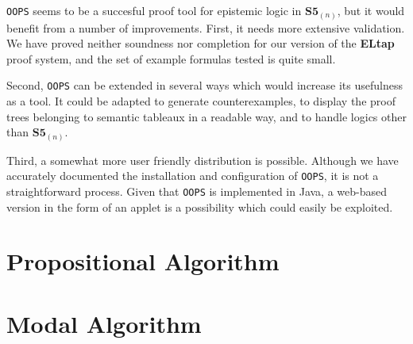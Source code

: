 \documentclass[11pt,a4paper]{article}
\begin{document}
{\tt OOPS} seems to be a succesful proof tool for epistemic logic in  $\textbf{S5}_{(n)}$, but it would benefit from a number of improvements. First, it needs more extensive validation. We have proved neither soundness nor completion for our version of the {\bf ELtap}~\cite{these} proof system, and the set of example formulas tested is quite small.
\par Second, {\tt OOPS} can be extended in several ways which would increase its usefulness as a tool. It could be adapted to generate counterexamples, to display the proof trees belonging to semantic tableaux in a readable way, and to handle logics other than $\textbf{S5}_{(n)}$.
\par Third, a somewhat more user friendly distribution is possible. Although we have accurately documented the installation and configuration of {\tt OOPS}, it is not a straightforward process. Given that {\tt OOPS} is implemented in Java, a web-based version in the form of an applet is a possibility which could easily be exploited.

\newpage


\appendix
\section{Propositional Algorithm}
\label{app:propalg}

\section{Modal Algorithm}
\label{app:modalg}

\end{document}
